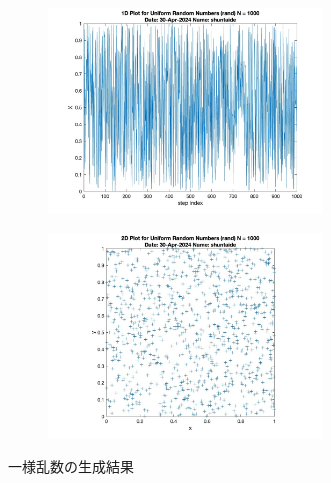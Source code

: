 \begin{figure}
\begin{subfigure}{0.48\linewidth}
	\end{subfigure}
	\begin{subfigure}{0.48\linewidth}
		\centering
		\includegraphics[width=0.8\textwidth]{src/figures/uniform/rand_1Dpl_N=1000.jpg}
		\label{fig:uniform-1Dpl}
	\end{subfigure}
	\begin{subfigure}{0.48\linewidth}
		\centering
		\includegraphics[width=0.8\textwidth]{src/figures/uniform/rand_2Dpl_N=1000.jpg}
		\label{fig:uniform-2Dpl}
	\end{subfigure}
	\caption{一様乱数の生成結果}\label{fig:uniform-random}
\end{figure}
